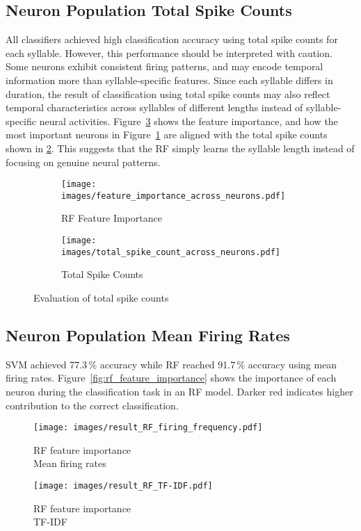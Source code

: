 \documentclass[../CLthesis.tex]{subfiles}
\begin{document}
\newpage
\subsection{Neuron Population Total Spike Counts}
All classifiers achieved high classification accuracy using total spike counts for each syllable. However, this performance should be interpreted with caution. Some neurons exhibit consistent firing patterns, and may encode temporal information more than syllable-specific features. Since each syllable differs in duration, the result of classification using total spike counts may also reflect temporal characteristics across syllables of different lengths instead of syllable-specific neural activities. Figure~\ref{fig:total_visualization} shows the feature importance, and how the most important neurons in Figure~\ref{fig:rf_total} are aligned with the total spike counts shown in \ref{fig:spike_count}. This suggests that the RF simply learns the syllable length instead of focusing on genuine neural patterns.
\begin{figure}[H]
  \centering
  \begin{subfigure}{0.45\textwidth}
      \texttt{[image: images/feature\_importance\_across\_neurons.pdf]}
      \caption{RF Feature Importance}
      \label{fig:rf_total}
  \end{subfigure}
  \begin{subfigure}{0.45\textwidth}
      \texttt{[image: images/total\_spike\_count\_across\_neurons.pdf]}
      \caption{Total Spike Counts}
      \label{fig:spike_count}
  \end{subfigure}

  \caption{Evaluation of total spike counts}
  \label{fig:total_visualization}
\end{figure}

\subsection{Neuron Population Mean Firing Rates}
SVM achieved 77.3\,\% accuracy while RF reached 91.7\,\% accuracy using mean firing rates. Figure~\ref{fig:rf_feature_importance} shows the importance of each neuron during the classification task in an RF model. Darker red indicates higher contribution to the correct classification.
\begin{figure}[H]
   \centering
   \begin{minipage}{0.45\textwidth}
      \centering
      \texttt{[image: images/result\_RF\_firing\_frequency.pdf]}
      \caption{RF feature importance\\\phantom{Figure 1.3: }Mean firing rates}
      \label{fig:rf_feature_importance}
   \end{minipage}
   \hfill
   \begin{minipage}{0.45\textwidth}
      \centering
      \texttt{[image: images/result\_RF\_TF-IDF.pdf]}
      \caption{RF feature importance\\\phantom{Figure 1.3: }TF-IDF}
      \label{fig:tfidf_feature_importance}
   \end{minipage}
\end{figure}
\end{document}
